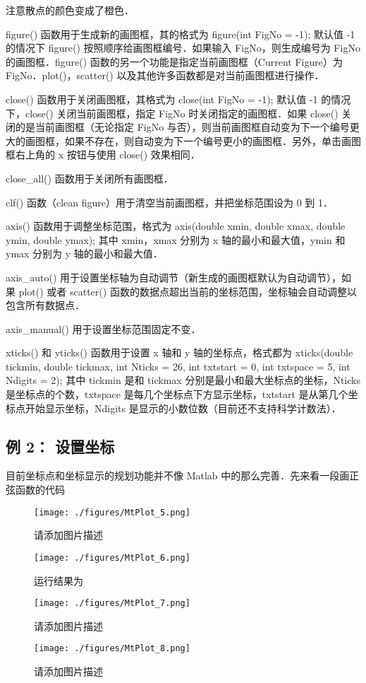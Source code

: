 注意散点的颜色变成了橙色．

figure() 函数用于生成新的画图框，其的格式为
figure(int FigNo = -1);
默认值 -1 的情况下 figure() 按照顺序给画图框编号．如果输入 FigNo，则生成编号为 FigNo 的画图框．figure() 函数的另一个功能是指定当前画图框（Current Figure）为 FigNo．plot()，scatter() 以及其他许多函数都是对当前画图框进行操作．

close() 函数用于关闭画图框，其格式为
close(int FigNo = -1);
默认值 -1 的情况下，close() 关闭当前画图框，指定 FigNo 时关闭指定的画图框．如果 close() 关闭的是当前画图框（无论指定 FigNo 与否），则当前画图框自动变为下一个编号更大的画图框，如果不存在，则自动变为下一个编号更小的画图框．另外，单击画图框右上角的 x 按钮与使用 close() 效果相同．

close_all() 函数用于关闭所有画图框．

clf() 函数（clean figure）用于清空当前画图框，并把坐标范围设为 0 到 1．

axis() 函数用于调整坐标范围，格式为
axis(double xmin, double xmax, double ymin, double ymax);
其中 xmin，xmax 分别为 x 轴的最小和最大值，ymin 和 ymax 分别为 y 轴的最小和最大值．

axis_auto() 用于设置坐标轴为自动调节（新生成的画图框默认为自动调节），如果 plot() 或者 scatter() 函数的数据点超出当前的坐标范围，坐标轴会自动调整以包含所有数据点．

axis_manual() 用于设置坐标范围固定不变．

xticks() 和 yticks() 函数用于设置 x 轴和 y 轴的坐标点，格式都为
xticks(double tickmin, double tickmax, int Nticks = 26, int txtstart = 0, int txtspace = 5, int Ndigits = 2);
其中 tickmin 是和 tickmax 分别是最小和最大坐标点的坐标，Nticks 是坐标点的个数，txtspace 是每几个坐标点下方显示坐标，txtstart 是从第几个坐标点开始显示坐标，Ndigits 是显示的小数位数（目前还不支持科学计数法）．

\subsection{例 2： 设置坐标}

目前坐标点和坐标显示的规划功能并不像 Matlab 中的那么完善．先来看一段画正弦函数的代码

\begin{figure}[ht]
\centering
\texttt{[image: ./figures/MtPlot\_5.png]}
\caption{请添加图片描述} \label{MtPlot_fig5}
\end{figure}

\begin{figure}[ht]
\centering
\texttt{[image: ./figures/MtPlot\_6.png]}
\caption{运行结果为} \label{MtPlot_fig6}
\end{figure}

\begin{figure}[ht]
\centering
\texttt{[image: ./figures/MtPlot\_7.png]}
\caption{请添加图片描述} \label{MtPlot_fig7}
\end{figure}

\begin{figure}[ht]
\centering
\texttt{[image: ./figures/MtPlot\_8.png]}
\caption{请添加图片描述} \label{MtPlot_fig8}
\end{figure}